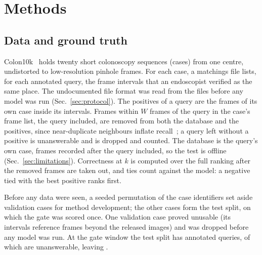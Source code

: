 \section{Methods}
\label{sec:methods}

\subsection{Data and ground truth}
\label{sec:data}
Colon10k~\cite{ma2021colon10k} holds twenty short colonoscopy sequences
(cases) from one centre, undistorted to low-resolution pinhole frames. For
each case, a matchings file lists, for each annotated query, the frame
intervals that an endoscopist verified as the same place. The undocumented
file format was read from the files before any model was run
(Sec.~\ref{sec:protocol}). The positives of a query are the frames of its own
case inside its intervals. Frames within $W$ frames of the query in the
case's frame list, the query included, are removed from both the database and
the positives, since near-duplicate neighbours inflate
recall~\cite{morlana2021selfsupervised}; a query left without a positive is
unanswerable and is dropped and counted. The database is the query's own
case, frames recorded after the query included, so the test is offline
(Sec.~\ref{sec:limitations}).
Correctness at $k$ is computed over the full ranking after the removed frames
are taken out, and ties count against the model: a negative tied with the
best positive ranks first.

Before any data were seen, a seeded permutation of the case identifiers set
aside validation cases for method development; the other
 cases form the test split, on which the gate was scored
once. One validation case proved unusable (its intervals reference frames
beyond the released images) and was dropped before any model was run. At the
gate window the test split has  annotated queries, of
which  are unanswerable, leaving .

